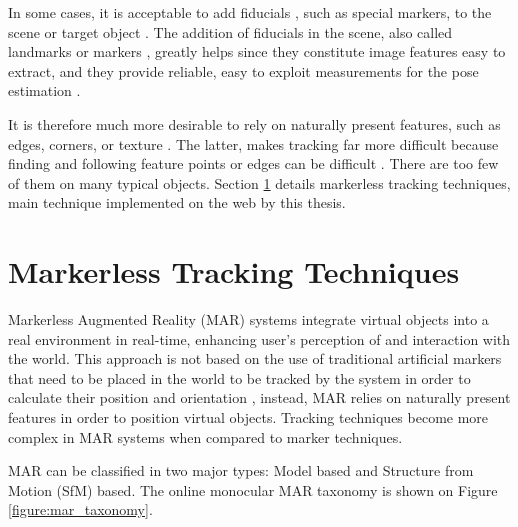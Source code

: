 In some cases, it is acceptable to add fiducials \cite{Cho1998}, such as special markers, to the scene or target object \cite{Cho1998,Lepetit2005}. The addition of fiducials in the scene, also called landmarks or markers \cite{Cho1998}, greatly helps since they constitute image features easy to extract, and they provide reliable, easy to exploit measurements for the pose estimation \cite{Cho1998,Lepetit2005}.

It is therefore much more desirable to rely on naturally present features, such as edges, corners, or texture \cite{Lepetit2005}. The latter, makes tracking far more difficult because finding and following feature points or edges can be difficult \cite{Lepetit2005}. There are too few of them on many typical objects. Section \ref{sec:basic_concepts:markerless_tracking_technique} details markerless tracking techniques, main technique implemented on the web by this thesis.


\section{Markerless Tracking Techniques} %
\label{sec:basic_concepts:markerless_tracking_technique}

Markerless Augmented Reality (MAR) systems integrate virtual objects into a real environment in real-time, enhancing user's perception of and interaction with the world. This approach is not based on the use of traditional artificial markers that need to be placed in the world to be tracked by the system in order to calculate their position and orientation \cite{Teichrieb2007}, instead, MAR relies on naturally present features in order to position virtual objects. Tracking techniques become more complex in MAR systems when compared to marker techniques.

MAR can be classified in two major types: Model based and Structure from Motion (SfM) based. The online monocular MAR taxonomy is shown on Figure \ref{figure:mar_taxonomy}.

